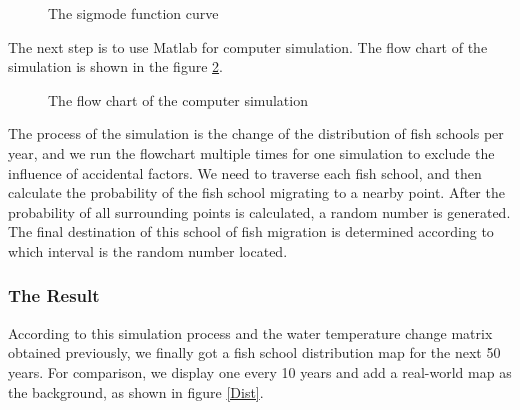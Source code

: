 \documentclass{mcmthesis}
\numberwithin{figure}{section}
\numberwithin{table}{section}
\begin{document}
  \begin{figure}[H]
    \caption{The sigmode function curve}\label{sigmodcurve}
  \end{figure}
The next step is to use Matlab for computer simulation. The flow chart of the simulation is shown in the figure \ref{matlabflow}.

\begin{figure}[H]
  \caption{The flow chart of the computer simulation}\label{matlabflow}
\end{figure}

The process of the simulation is the change of the distribution of fish schools per year, and we run the flowchart multiple times for one simulation to exclude the influence of accidental factors. We need to traverse each fish school, and then calculate the probability of the fish school migrating to a nearby point. After the probability of all surrounding points is calculated, a random number is generated. The final destination of this school of fish migration is determined according to which interval is the random number located.

\subsubsection{The Result}
According to this simulation process and the water temperature change matrix obtained previously, we finally got a fish school distribution map for the next 50 years. For comparison, we display one every 10 years and add a real-world map as the background, as shown in figure \ref{Dist}.
\end{document}
